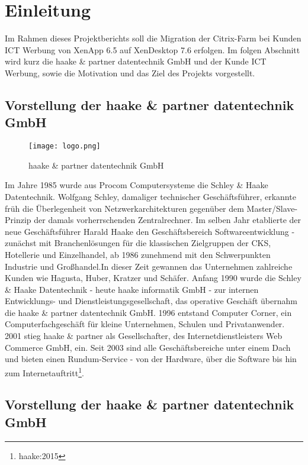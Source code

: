 
\chapter{Einleitung}
Im Rahmen dieses Projektberichts soll die Migration der Citrix-Farm bei Kunden ICT Werbung von XenApp 6.5 auf XenDesktop 7.6 erfolgen. 
Im folgen Abschnitt wird kurz die haake \& partner datentechnik GmbH und der Kunde ICT Werbung, sowie die Motivation und das Ziel des Projekts vorgestellt.

\section{Vorstellung der haake \& partner datentechnik GmbH}

\begin{wrapfigure}{r}{.5\textwidth}
\texttt{[image: logo.png]}
\vspace{-15pt}
\caption{haake \& partner datentechnik GmbH}
\end{wrapfigure}

Im Jahre 1985 wurde aus Procom Computersysteme die Schley \& Haake Datentechnik. Wolfgang Schley, damaliger technischer Geschäftsführer, erkannte früh die Überlegenheit von  Netzwerkarchitekturen gegenüber dem Master/Slave-Prinzip der damals vorherrschenden Zentralrechner. Im selben Jahr etablierte der neue Geschäftsführer Harald Haake den Geschäftsbereich Softwareentwicklung - zunächst mit Branchenlösungen für die klassischen Zielgruppen der CKS, Hotellerie und Einzelhandel, ab 1986 zunehmend mit den Schwerpunkten Industrie und Großhandel.In dieser Zeit gewannen das Unternehmen zahlreiche Kunden wie Hagusta, Huber, Kratzer und Schäfer. Anfang 1990 wurde die Schley \& Haake Datentechnik - heute haake informatik GmbH - zur internen Entwicklungs- und Dienstleistungsgesellschaft, das operative Geschäft übernahm die haake \& partner datentechnik GmbH. 1996 entstand Computer Corner, ein Computerfachgeschäft für kleine Unternehmen, Schulen und Privatanwender. 2001  stieg haake \& partner als Gesellschafter, des Internetdienstleisters Web Commerce GmbH, ein. Seit 2003 sind alle Geschäftsbereiche unter einem Dach und bieten einen Rundum-Service - von der Hardware, über die Software bis hin zum Internetauftritt\footnote{haake:2015}. 

\section{Vorstellung der haake \& partner datentechnik GmbH}

